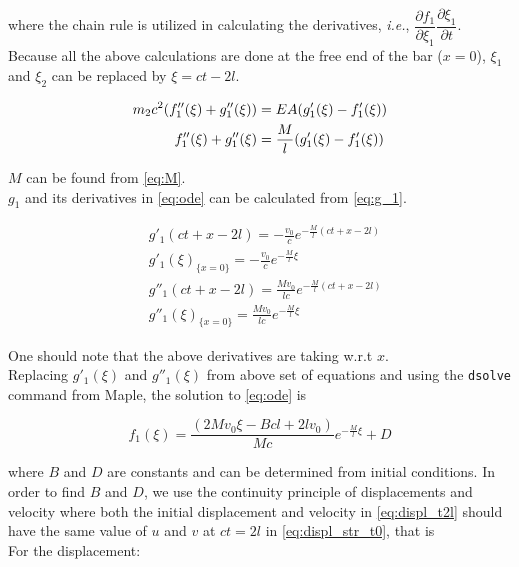 \documentclass{article}
\begin{document}
where the chain rule is utilized in calculating the derivatives, \emph{i.e.}, $\dfrac{\partial f_1}{\partial \xi_1} \dfrac{\partial \xi_1}{\partial t}$. \\

Because all the above calculations are done at the free end of the bar ($x=0$), $\xi_1$ and $\xi_2$ can be replaced by $\xi = ct-2l$.

\begin{align}
    m_2 c^2 (f''_1(\xi) + g''_1(\xi)) &= EA (g'_1(\xi)- f'_1(\xi)) \notag\\ 
    f''_1(\xi) + g''_1(\xi) &= \frac{M}{l} (g'_1(\xi) - f'_1(\xi))
    \label{eq:ode}
\end{align}

$M$ can be found from \cref{eq:M}. \\

$g_1$ and its derivatives in \cref{eq:ode} can be calculated from \cref{eq:g_1}.

\begin{align*}
    & g'_1(ct + x -2l) = -\frac{v_0}{c} e^{-\textstyle\frac{M}{l}(ct + x -2l)} \\
    & g'_1(\xi)_{\{x=0\}} = -\frac{v_0}{c} e^{-\textstyle\frac{M}{l}\xi} \\
    & g''_1(ct + x -2l) = \frac{M v_0}{l c} e^{-\textstyle\frac{M}{l}(ct + x -2l)} \\
    & g''_1(\xi)_{\{x=0\}} = \frac{M v_0}{l c} e^{-\textstyle\frac{M}{l}\xi} 
\end{align*}

One should note that the above derivatives are taking w.r.t $x$. \\

Replacing $g'_1(\xi)$ and $g''_1(\xi)$ from above set of equations and using the \texttt{dsolve} command from Maple, the solution to \cref{eq:ode} is

\begin{equation}
    f_1(\xi) = \frac{(2 M v_0 \xi - B c l + 2 l v_0)}{M c} e^{-\textstyle\frac{M}{l}\xi} + D
\end{equation}

where $B$ and $D$ are constants and can be determined from initial conditions. In order to find $B$ and $D$, we use the continuity principle of displacements and velocity where both the initial displacement and velocity in \cref{eq:displ_t2l} should have the same value of $u$ and $v$ at $ct = 2l$ in \cref{eq:displ_str_t0}, that is \\

For the displacement:
\end{document}
